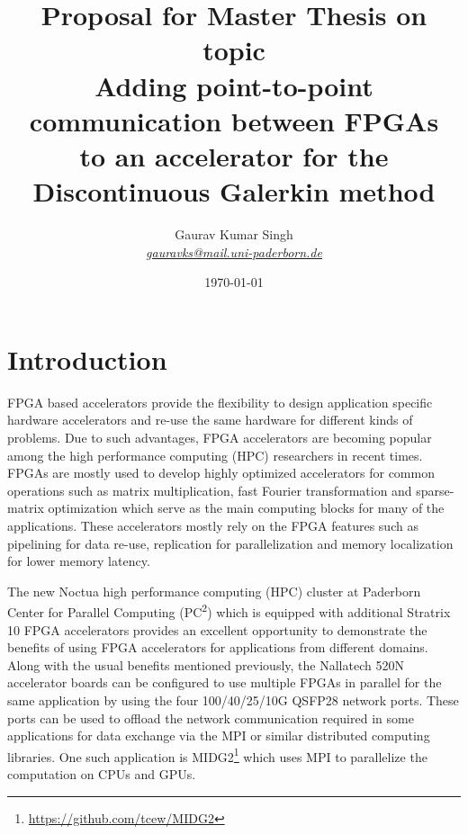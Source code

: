\documentclass[english,notitlepage]{hgbreport}
\author{Gaurav Kumar Singh \\ \textit{\href{mailto:gauravks@mail.uni-paderborn.de}{gauravks@mail.uni-paderborn.de}}}
\title{Proposal for Master Thesis on topic\\
	Adding point-to-point communication between FPGAs\\
	to an accelerator for the Discontinuous Galerkin method}
\date{\today}
\begin{document}
\maketitle

\section{Introduction}

FPGA based accelerators provide the flexibility to design application specific hardware accelerators and re-use the same
hardware for different kinds of problems. Due to such advantages, FPGA accelerators are becoming popular among
the high performance computing (HPC) researchers in recent times. FPGAs are mostly used to develop highly
optimized accelerators for common operations such as matrix multiplication, fast Fourier transformation
and sparse-matrix optimization which serve as the main computing blocks for many of the applications. These accelerators
mostly rely on the FPGA features such as pipelining for data re-use, replication for parallelization and memory localization
for lower memory latency.

The new Noctua high performance computing (HPC) cluster at Paderborn Center for Parallel Computing  (PC\textsuperscript{2})
which is equipped with additional Stratrix 10 FPGA accelerators provides an excellent opportunity to demonstrate the benefits
of using FPGA accelerators for applications from different domains. Along with the usual benefits mentioned previously, the
Nallatech 520N accelerator boards can be configured to use multiple FPGAs in parallel for the same application by
using the four 100/40/25/10G QSFP28 network ports. These ports can be used to offload the network communication required in
some applications for data exchange via the MPI or similar distributed computing libraries. One such application
is MIDG2\footnote{\url{https://github.com/tcew/MIDG2}} which uses MPI to parallelize the computation on CPUs and GPUs.
\end{document}
